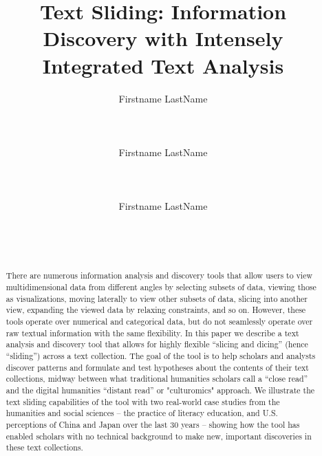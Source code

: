 \documentclass{sig-alternate}
\begin{document}
\title{Text Sliding: Information Discovery with Intensely Integrated Text Analysis}

\author{%
\alignauthor Firstname LastName\\
       \\
       \\
       \\
\alignauthor Firstname LastName\\
       \\
       \\
       \\
\alignauthor Firstname LastName\\
       \\
       \\
       \\
}

\maketitle

\begin{abstract}
There are numerous information analysis and discovery tools that allow users to view multidimensional data from different angles by selecting subsets of data, viewing those as visualizations, moving laterally to view other subsets of data, slicing into another view, expanding the viewed data by relaxing constraints, and so on.  However, these tools operate over numerical and categorical data, but do not seamlessly operate over raw textual information with the same flexibility. In this paper we describe a text analysis and discovery tool that allows for highly flexible  ``slicing and dicing'' (hence  ``sliding'') across a text collection.  The goal of the tool is to help scholars and analysts discover patterns and formulate and test hypotheses about the contents of their text collections, midway between what traditional humanities scholars call a  ``close read'' and the digital humanities  ``distant read'' or "culturomics" approach.  We illustrate the text sliding capabilities of the tool with two real-world case studies from the humanities and social sciences -- the practice of literacy education, and U.S. perceptions of China and Japan over the last 30 years -- showing how the tool has enabled scholars with no technical background to make new, important discoveries in these text collections.

\end{abstract}
\end{document}
